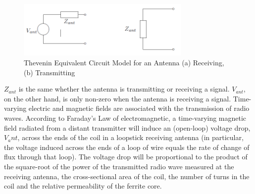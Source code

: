 \documentclass[utf8]{article}
\begin{document}
{	\begin{figure}[H]
		\begin{small}
			\begin{center}
				\includegraphics[width=0.75\textwidth]{figures/Figure6.png}
			\end{center}
			\caption{Thevenin Equivalent Circuit Model for an Antenna (a) Receiving, (b) Transmitting}
			\label{fig:thevenin}
		\end{small}
	\end{figure}
	

	$Z_{ant}$ is the same whether the antenna is transmitting or receiving a signal. $V_{ant}$, on the other hand, is only non-zero when the antenna is receiving a signal. Time-varying electric and magnetic fields are associated with the transmission of radio waves. According to Faraday’s Law of electromagnetic, a time-varying magnetic field radiated from a distant transmitter will induce an (open-loop) voltage drop, $V_ant$, across the ends of the coil in a loopstick receiving antenna (in particular, the voltage induced across the ends of a loop of wire equals the rate of change of flux through that loop). The voltage drop will be proportional to the product of the square-root of the power of the transmitted radio wave measured at the receiving antenna, the cross-sectional area of the coil, the number of turns in the coil and the relative permeability of the ferrite core.

}
\end{document}
